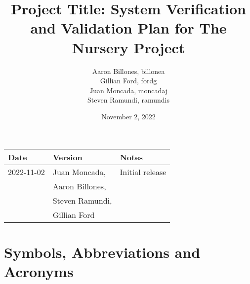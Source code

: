 \documentclass[12pt, titlepage]{article}
\begin{document}
\title{Project Title: System Verification and Validation Plan for The Nursery Project} 
\author{Aaron Billones, billonea\\Gillian Ford, fordg\\Juan Moncada, moncadaj\\Steven Ramundi, ramundis}

\date{November 2, 2022}


\maketitle
\thispagestyle{empty}




\begin{tabularx}{\textwidth}{p{3cm}p{4cm}X}
    \toprule {\bf Date} & {\bf Version} & {\bf Notes}\\
    \midrule
    2022-11-02 & Juan Moncada,& Initial release\\&Aaron Billones,\\&Steven Ramundi,\\&Gillian Ford \\
    
    \bottomrule
\end{tabularx}

\newpage

\tableofcontents

\listoftables

\newpage

\section{Symbols, Abbreviations and Acronyms}
\end{document}
